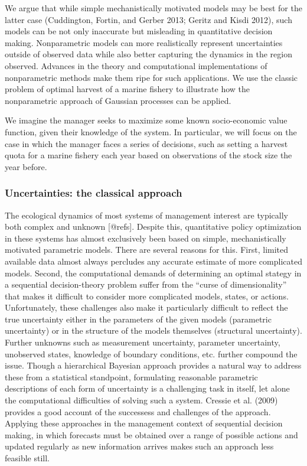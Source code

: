 \documentclass[author-year, review]{elsarticle} %
\begin{document}
We argue that while simple mechanistically motivated models may be best
for the latter case (Cuddington, Fortin, and Gerber 2013; Geritz and
Kisdi 2012), such models can be not only inaccurate but misleading in
quantitative decision making. Nonparametric models can more
realistically represent uncertainties outside of observed data while
also better capturing the dynamics in the region observed. Advances in
the theory and computational implementations of nonparametric methods
make them ripe for such applications. We use the classic problem of
optimal harvest of a marine fishery to illustrate how the nonparametric
approach of Gaussian processes can be applied.

We imagine the manager seeks to maximize some known socio-economic value
function, given their knowledge of the system. In particular, we will
focus on the case in which the manager faces a series of decisions, such
as setting a harvest quota for a marine fishery each year based on
observations of the stock size the year before.

\subsubsection{Uncertainties: the classical approach}

The ecological dynamics of most systems of management interest are
typically both complex and unknown {[}@refs{]}. Despite this,
quantitative policy optimization in these systems has almost exclusively
been based on simple, mechanistically motivated parametric models. There
are several reasons for this. First, limited available data almost
always percludes any accurate estimate of more complicated models.
Second, the computational demands of determining an optimal stategy in a
sequential decision-theory problem suffer from the ``curse of
dimensionality'' that makes it difficult to consider more complicated
models, states, or actions. Unfortunately, these challenges also make it
particularly difficult to reflect the true uncertainty either in the
parameters of the given models (parametric uncertainty) or in the
structure of the models themselves (structural uncertainty). Further
unknowns such as measurement uncertainty, parameter uncertainty,
unobserved states, knowledge of boundary conditions, etc. further
compound the issue. Though a hierarchical Bayesian approach provides a
natural way to address these from a statistical standpoint, formulating
reasonable parametric descriptions of each form of uncertainty is a
challenging task in itself, let alone the computational difficulties of
solving such a system. Cressie et al. (2009) provides a good account of
the successess and challenges of the approach. Applying these approaches
in the management context of sequential decision making, in which
forecasts must be obtained over a range of possible actions and updated
regularly as new information arrives makes such an approach less
feasible still.
\end{document}
